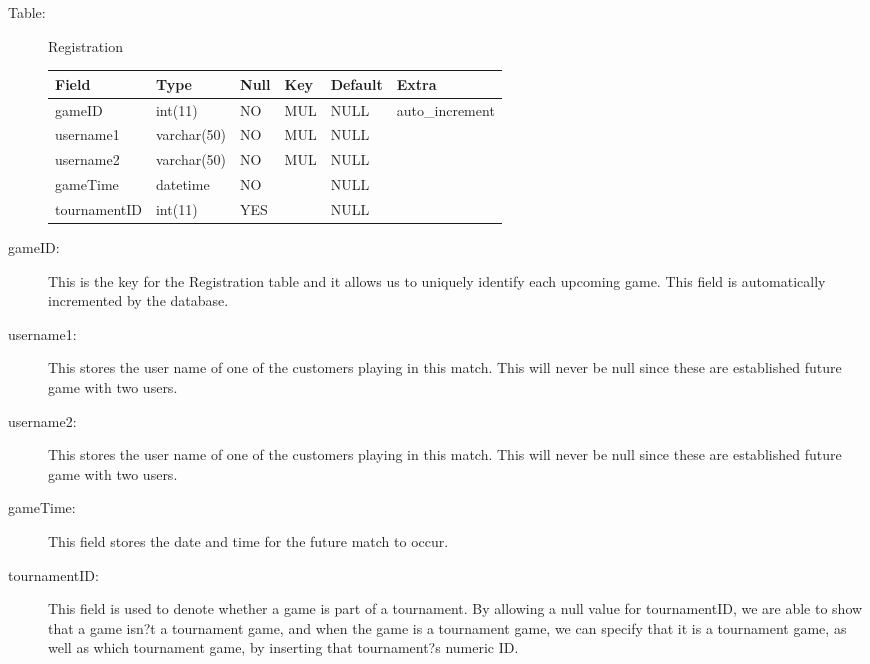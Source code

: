 			\begin{description}
				\item[Table:] Registration
				
				\begin{center}
					\begin{tabular}{ | l | l | l | l | l | l|}
						\hline
						Field & Type & Null & Key & Default & Extra \\ \hline \hline
						gameID & int(11) & NO & MUL & NULL & auto\_increment \\ \hline
						username1 & varchar(50) & NO & MUL & NULL &\hspace{1 pc}  \\ \hline
						username2 & varchar(50) & NO & MUL& NULL &\hspace{1 pc}  \\ \hline
						gameTime & datetime & NO &\hspace{1 pc} & NULL &\hspace{1 pc}  \\ \hline
						tournamentID & int(11) & YES &\hspace{1 pc} & NULL &\hspace{1 pc}   \\
						\hline
					\end{tabular}
				\end{center}

				\item[gameID:] This is the key for the Registration table and it allows us to uniquely identify each upcoming game. This field is automatically incremented by the database.
				\item[username1:] This stores the user name of one of the customers playing in this match. This will never be null since these are established future game with two users.
				\item[username2:] This stores the user name of one of the customers playing in this match. This will never be null since these are established future game with two users.
				\item[gameTime:] This field stores the date and time for the future match to occur.
				\item[tournamentID:] This field is used to denote whether a game is part of a tournament. By allowing a null value for tournamentID, we are able to show that a game isn?t a tournament game, and when the game is a tournament game, we can specify that it is a tournament game, as well as  which tournament game, by inserting that tournament?s numeric ID.
			\end{description}

